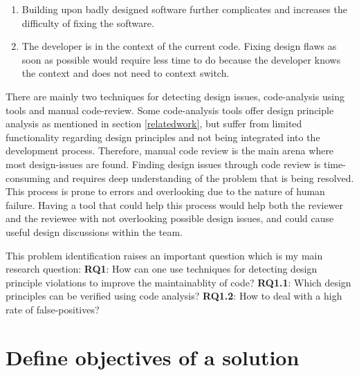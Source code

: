 \documentclass{report}
\begin{document}
\begin{enumerate}
    \item Building upon badly designed software further complicates and increases the difficulty of fixing the software.

    \item The developer is in the context of the current code. Fixing design flaws as soon as possible would require less time to do because the developer knows the context and does not need to context switch.

\end{enumerate}


There are mainly two techniques for detecting design issues, code-analysis using tools and manual code-review. Some code-analysis tools offer design principle analysis as mentioned in section \ref{relatedwork}, but suffer from limited functionality regarding design principles and not being integrated into the development process. Therefore, manual code review is the main arena where most design-issues are found. Finding design issues through code review is time-consuming and requires deep understanding of the problem that is being resolved. This process is prone to errors and overlooking due to the nature of human failure. Having a tool that could help this process would help both the reviewer and the reviewee with not overlooking possible design issues, and could cause useful design discussions within the team.

\hfill \newline
This problem identification raises an important question which is my main research question:
\hfill \newline
\hfill \newline
\textbf{RQ1}: How can one use techniques for detecting design principle violations to improve the maintainablity of code? \newline
\textbf{RQ1.1}: Which design principles can be verified using code analysis? \newline
\textbf{RQ1.2}: How to deal with a high rate of false-positives? 


\section{Define objectives of a solution}
\label{objectives-of-solution}
\end{document}
